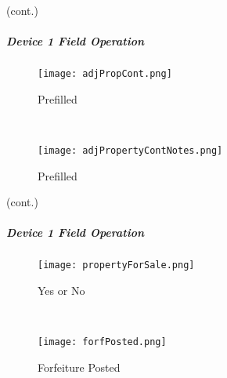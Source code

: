  {\footnotesize (cont.)}
 \vspace{.5in}

 \vspace{2.25in}

 \vspace{3.25in}

 \clearpage

 \subparagraph*{Device 1 Field Operation}
 \begin{wrapfigure}{r}{0.6\textwidth}
 \centering
     \texttt{[image: adjPropCont.png]} %
 \caption{Prefilled}
 \vspace{.05in}

 \HRule \\[.4cm] %
 \vspace{.1in}

     \texttt{[image: adjPropertyContNotes.png]}
 \caption{Prefilled}
 \end{wrapfigure}



 {\footnotesize (cont.)}
 \vspace{.5in}

 \vspace{3in}



 \clearpage

 \subparagraph*{Device 1 Field Operation}
 \begin{wrapfigure}{r}{0.6\textwidth}
 \centering
     \texttt{[image: propertyForSale.png]}
 \caption{Yes or No}
  \vspace{.05in}

 \HRule \\[.4cm] %
 \vspace{.1in} 
 
\texttt{[image: forfPosted.png]} %
 \caption{Forfeiture Posted}

 
 \end{wrapfigure}

